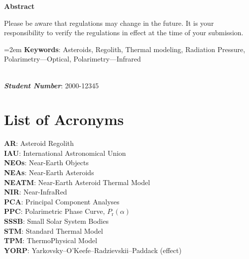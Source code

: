 \documentclass[12pt]{report}
\makeatletter
\renewcommand{\abstractname}{\large Abstract}
\renewenvironment{abstract}{%
    \if@twocolumn
    \section*{\abstractname}%
    \else
    \small
    \begin{center}%
        {\bfseries \abstractname\vspace{-.5em}\vspace{\z@}}%
    \end{center}%
    \quotation
    \fi}
{\if@twocolumn\else\endquotation\fi}
\renewenvironment{abstract}
 {\small
  \begin{center}
  \bfseries \abstractname\vspace{-.5em}\vspace{0pt}
  \end{center}
  \list{}{%
    \setlength{\leftmargin}{10mm}%
    \setlength{\rightmargin}{\leftmargin}%
  }%
  \item\relax}
 {\endlist}
\makeatother
\begin{document}
\begin{abstract}
Please be aware that regulations may change in the future. It is your responsibility to verify the regulations in effect at the time of your submission.


\hangindent=2em
\textbf{Keywords}: Asteroids, Regolith, Thermal modeling, Radiation Pressure, Polarimetry---Optical, Polarimetry---Infrared

~\\
\noindent \textbf{\textit{Student Number}}: 2000-12345

\end{abstract}


{
\setcounter{tocdepth}{2}
\tableofcontents
{}
\listoffigures
{}
\listoftables
}

\chapter*{List of Acronyms}
\noindent\textbf{AR}: Asteroid Regolith
\\
\noindent\textbf{IAU}: International Astronomical Union
\\
\noindent\textbf{NEOs}: Near-Earth Objects
\\
\noindent\textbf{NEAs}: Near-Earth Asteroids
\\
\noindent\textbf{NEATM}: Near-Earth Asteroid Thermal Model
\\
\noindent\textbf{NIR}: Near-InfraRed
\\
\noindent\textbf{PCA}: Principal Component Analyses
\\
\noindent\textbf{PPC}: Polarimetric Phase Curve, $P_\mathrm{r}(\alpha)$
\\
\noindent\textbf{SSSB}: Small Solar System Bodies
\\
\noindent\textbf{STM}: Standard Thermal Model
\\
\noindent\textbf{TPM}: ThermoPhysical Model
\\
\noindent\textbf{YORP}: Yarkovsky--O'Keefe--Radzievskii--Paddack (effect)
\end{document}
